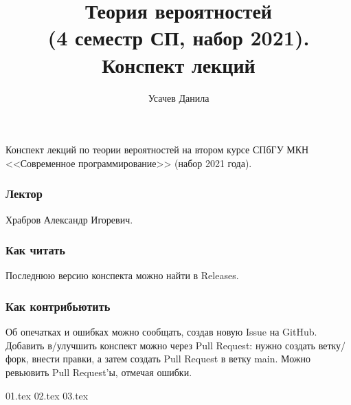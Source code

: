 \documentclass[a4paper,14pt]{extarticle}
\title{Теория вероятностей \\
  (4 семестр СП, набор 2021). \\
  Конспект лекций}
\author{Усачев Данила}
\theoremstyle{definition}
\theoremstyle{definition}
\theoremstyle{plain}
\theoremstyle{plain}
\theoremstyle{plain}
\theoremstyle{plain}
\theoremstyle{definition}
\theoremstyle{definition}
\theoremstyle{definition}
\theoremstyle{definition}
\theoremstyle{definition}
\theoremstyle{definition}
\theoremstyle{plain}
\theoremstyle{plain}
\theoremstyle{plain}
\theoremstyle{plain}
\theoremstyle{definition}
\theoremstyle{definition}
\theoremstyle{definition}
\theoremstyle{definition}
\theoremstyle{definition}
\begin{document}
\maketitle

Конспект лекций по теории вероятностей на втором курсе СПбГУ МКН <<Современное программирование>> (набор 2021 года).
\subsubsection*{Лектор}
Храбров Александр Игоревич.
\subsubsection*{Как читать}
Последнюю версию конспекта можно найти в Releases.
\subsubsection*{Как контрибьютить}
Об опечатках и ошибках можно сообщать, создав новую Issue на GitHub.
Добавить в/улучшить конспект можно через Pull Request: нужно создать ветку/форк, внести правки, а затем создать Pull Request в ветку main.
Можно ревьювить Pull Request'ы, отмечая ошибки.
\newpage
\tableofcontents
\newpage

{01.tex}
{02.tex}
{03.tex}
\end{document}
